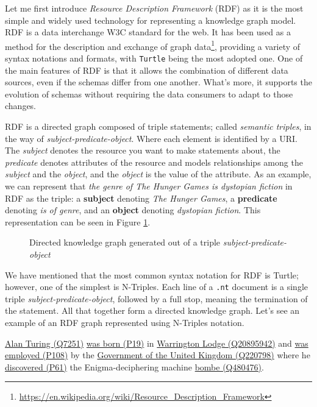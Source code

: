 Let me first introduce \textit{Resource Description Framework} (RDF) as it is the most simple and widely used technology for representing a knowledge graph model. RDF is a data interchange W3C standard for the web. It has been used as a method for the description and exchange of graph data\footnote{\url{https://en.wikipedia.org/wiki/Resource_Description_Framework}}, providing a variety of syntax notations and formats, with \texttt{Turtle} being the most adopted one. One of the main features of RDF is that it allows the combination of different data sources, even if the schemas differ from one another. What's more, it supports the evolution of schemas without requiring the data consumers to adapt to those changes.

RDF is a directed graph composed of triple statements; called \textit{semantic triples}, in the way of \textit{subject-predicate-object}. Where each element is identified by a URI. The \textit{subject} denotes the resource you want to make statements about, the \textit{predicate} denotes attributes of the resource and models relationships among the \textit{subject} and the \textit{object}, and the \textit{object} is the value of the attribute. As an example, we can represent that \textit{the genre of The Hunger Games is dystopian fiction} in RDF as the triple: a \textbf{subject} denoting \textit{The Hunger Games}, a \textbf{predicate} denoting \textit{is of genre}, and an \textbf{object} denoting \textit{dystopian fiction}. This representation can be seen in Figure \ref{fig:RDF}.

\begin{figure}[ht]
    \centering
    
    \caption{Directed knowledge graph generated out of a triple \textit{subject-predicate-object}}
    \label{fig:RDF}
\end{figure}

We have mentioned that the most common syntax notation for RDF is Turtle; however, one of the simplest is N-Triples. Each line of a \texttt{.nt} document is a single triple \textit{subject-predicate-object}, followed by a full stop, meaning the termination of the statement. All that together form a directed knowledge graph. Let's see an example of an RDF graph represented using N-Triples notation.

\begin{example}
    \href{https://www.wikidata.org/entity/Q7251}{Alan Turing (Q7251)} \href{https://www.wikidata.org/entity/P19}{was born (P19)} in \href{https://www.wikidata.org/entity/Q20895942}{Warrington Lodge (Q20895942)} and \href{https://www.wikidataWShEx.org/entity/P108}{was employed (P108)} by the \href{https://www.wikidata.org/entity/Q220798}{Government of the United Kingdom (Q220798)} where he \href{https://www.wikidata.org/entity/P61}{discovered (P61)} the Enigma-deciphering machine \href{https://www.wikidata.org/entity/Q480476}{bombe (Q480476)}.
\end{example}

